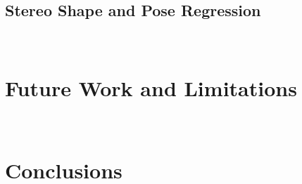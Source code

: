 
\subsection{Stereo Shape and Pose Regression}
~\label{subsec:discussion_spp}

\section{Future Work and Limitations}
~\label{sec:discussion_limitations}




\section{Conclusions}
~\label{sec:discussion_conclusions}